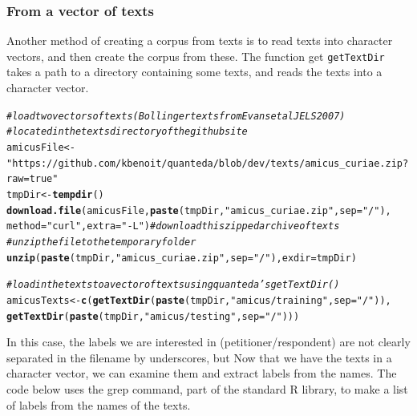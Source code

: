 \documentclass[11pt]{article}\usepackage[]{graphicx}\usepackage[]{color}
\makeatletter
\newcommand{\hlstr}[1]{\textcolor[rgb]{0.192,0.494,0.8}{#1}}%
\newcommand{\hlcom}[1]{\textcolor[rgb]{0.678,0.584,0.686}{\textit{#1}}}%
\newcommand{\hlstd}[1]{\textcolor[rgb]{0.345,0.345,0.345}{#1}}%
\newcommand{\hlkwb}[1]{\textcolor[rgb]{0.69,0.353,0.396}{#1}}%
\newcommand{\hlkwc}[1]{\textcolor[rgb]{0.333,0.667,0.333}{#1}}%
\newcommand{\hlkwd}[1]{\textcolor[rgb]{0.737,0.353,0.396}{\textbf{#1}}}%
\newenvironment{kframe}{%
 \def\at@end@of@kframe{}%
 \ifinner\ifhmode%
  \def\at@end@of@kframe{\end{minipage}}%
  \begin{minipage}{\columnwidth}%
 \fi\fi%
 \def\FrameCommand##1{\hskip\@totalleftmargin \hskip-\fboxsep
 \colorbox{shadecolor}{##1}\hskip-\fboxsep
     \hskip-\linewidth \hskip-\@totalleftmargin \hskip\columnwidth}%
 \MakeFramed {\advance\hsize-\width
   \@totalleftmargin\z@ \linewidth\hsize
   \@setminipage}}%
 {\par\unskip\endMakeFramed%
 \at@end@of@kframe}
\newenvironment{knitrout}{}{} %
\makeatother
\begin{document}
\subsubsection{From a vector of texts}

Another method of creating a corpus from texts is to read texts into character vectors, and then create the corpus from these. The function get \texttt{getTextDir} takes a path to a directory containing some texts, and reads the texts into a character vector.

\begin{knitrout}\footnotesize
{}\color{fgcolor}\begin{kframe}
\begin{alltt}
\hlcom{# load two vectors of texts (Bollinger texts from Evans et al JELS 2007)}
\hlcom{# located in the texts directory of the github site}
\hlstd{amicusFile} \hlkwb{<-} \hlstr{"https://github.com/kbenoit/quanteda/blob/dev/texts/amicus_curiae.zip?raw=true"}
\hlstd{tmpDir} \hlkwb{<-} \hlkwd{tempdir}\hlstd{()}
\hlkwd{download.file}\hlstd{(amicusFile,} \hlkwd{paste}\hlstd{(tmpDir,} \hlstr{"amicus_curiae.zip"}\hlstd{,} \hlkwc{sep}\hlstd{=}\hlstr{"/"}\hlstd{),}
              \hlkwc{method}\hlstd{=}\hlstr{"curl"}\hlstd{,} \hlkwc{extra}\hlstd{=}\hlstr{"-L"}\hlstd{)} \hlcom{# download this zipped archive of texts}
\hlcom{# unzip the file to the temporary folder}
\hlkwd{unzip}\hlstd{(}\hlkwd{paste}\hlstd{(tmpDir,} \hlstr{"amicus_curiae.zip"}\hlstd{,} \hlkwc{sep}\hlstd{=}\hlstr{"/"}\hlstd{),} \hlkwc{exdir}\hlstd{=tmpDir)}

\hlcom{# load in the texts to a vector of texts using quanteda's getTextDir()}
\hlstd{amicusTexts} \hlkwb{<-} \hlkwd{c}\hlstd{(}\hlkwd{getTextDir}\hlstd{(}\hlkwd{paste}\hlstd{(tmpDir,} \hlstr{"amicus/training"}\hlstd{,} \hlkwc{sep}\hlstd{=}\hlstr{"/"}\hlstd{)),}
                 \hlkwd{getTextDir}\hlstd{(}\hlkwd{paste}\hlstd{(tmpDir,} \hlstr{"amicus/testing"}\hlstd{,} \hlkwc{sep}\hlstd{=}\hlstr{"/"}\hlstd{)))}
\end{alltt}
\end{kframe}
\end{knitrout}

In this case, the labels we are interested in (petitioner/respondent) are not clearly separated in the filename by underscores, but Now that we have the texts in a character vector, we can examine them and extract labels from the names. The code below uses the grep command, part of the standard R library, to make a list of labels from the names of the texts.
\end{document}
